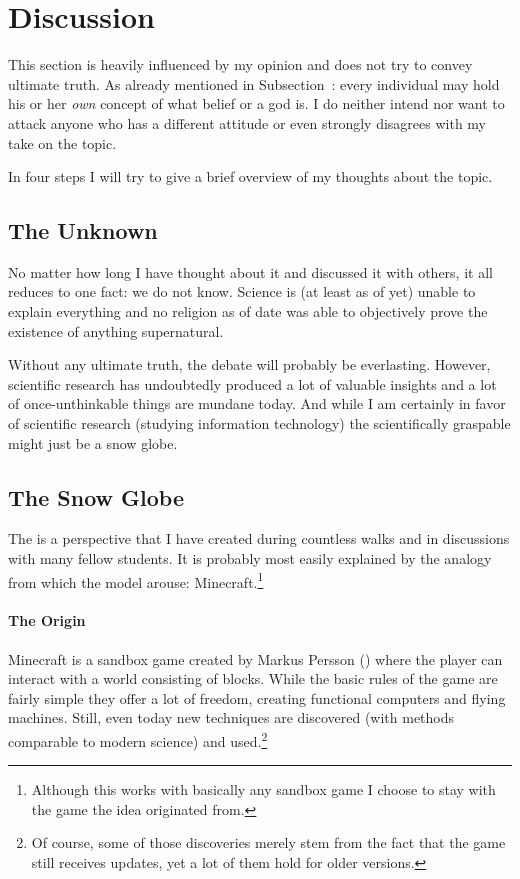\section{Discussion}
\label{sec:Discussion}This section is heavily influenced by my opinion and does not try to convey  ultimate truth. As already mentioned in Subsection~\nohyper{\ref{subsec:religious-views}}: every individual may hold his or her \emph{own} concept of what belief or a god is. I do neither intend nor want to attack anyone who has a different attitude or even strongly disagrees with my take on the topic.

In four steps I will try to give a brief overview of my thoughts about the topic.

\subsection{The Unknown}\label{subsec:the-unknown}
No matter how long I have thought about it and discussed it with others, it all reduces to one fact: we do not know. Science is (at least as of yet) unable to explain everything and no religion as of date was able to objectively prove the existence of anything supernatural.

Without any ultimate truth, the debate will probably be everlasting. However, scientific research has undoubtedly produced a lot of valuable insights and a lot of once-unthinkable things are mundane today.
And while I am certainly in favor of scientific research (studying information technology) the scientifically graspable might just be a snow globe.

\subsection{The Snow Globe}\label{subsec:snow-globe}
The  is a perspective that I have created during countless walks and in discussions with many fellow students.
It is probably most easily explained by the analogy from which the model arouse: Minecraft.\footnote{Although this works with basically any sandbox game I choose to stay with the game the idea originated from.}

\paragraph{The Origin} Minecraft is a sandbox game created by Markus Persson () where the player can interact with a world consisting of blocks. While the basic rules of the game are fairly simple they offer a lot of freedom, creating functional computers and flying machines. Still, even today new techniques are discovered (with methods comparable to modern science) and used.\footnote{Of course, some of those discoveries merely stem from the fact that the game still receives updates, yet a lot of them hold for older versions.}

